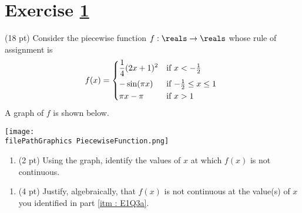 %
%
%
%


\newpage

\section{Exercise \ref{sec : Math112 Spring2022 Exam1 Q3}}
\label{sec : Math112 Spring2022 Exam1 Q3}


(18 pt) Consider the piecewise function $f : \reals \rightarrow \reals$ whose rule of assignment is
\begin{align*}
f(x)
=
\begin{dcases*}
\frac{1}{4} (2 x + 1)^{2}	&	if $x < -\frac{1}{2}$			\\
-\sin(\pi x)				&	if $-\frac{1}{2} \leq x \leq 1$	\\
\pi x - \pi				&	if $x > 1$
\end{dcases*}
\end{align*}
A graph of $f$ is shown below.
\begin{center}
\texttt{[image: \\filePathGraphics PiecewiseFunction.png]}
\end{center}



\begin{enumerate}[label=(\alph*)]
\item\label{itm : E1Q3a} (2 pt) Using the graph, identify the values of $x$ at which $f(x)$ is not continuous.
\end{enumerate}




\begin{enumerate}[resume,label=(\alph*)]
\item\label{itm : E1Q3b} (4 pt) Justify, algebraically, that $f(x)$ is not continuous at the value(s) of $x$ you identified in part \ref{itm : E1Q3a}.
\end{enumerate}

